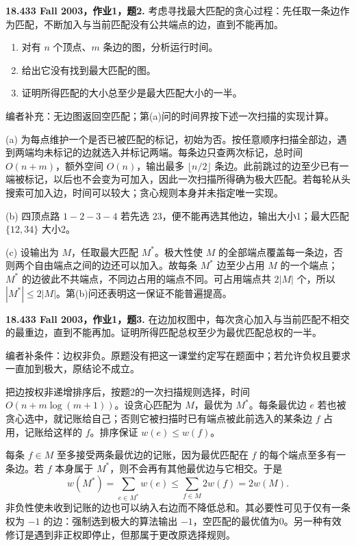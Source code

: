 \begin{exercise}\label{mit:18433-a1-q2}
\textbf{18.433 Fall 2003，作业1，题2.}
考虑寻找最大匹配的贪心过程：先任取一条边作为匹配，不断加入与当前匹配没有公共端点的边，直到不能再加。
\begin{enumerate}[label=(\alph*)]
\item 对有 $n$ 个顶点、$m$ 条边的图，分析运行时间。
\item 给出它没有找到最大匹配的图。
\item 证明所得匹配的大小总至少是最大匹配大小的一半。
\end{enumerate}
编者补充：无边图返回空匹配；第(a)问的时间界按下述一次扫描的实现计算。
\end{exercise}
\begin{solution}
(a) 为每点维护一个是否已被匹配的标记，初始为否。按任意顺序扫描全部边，遇到两端均未标记的边就选入并标记两端。每条边只查两次标记，总时间 $O(n+m)$，额外空间 $O(n)$，输出最多 $\lfloor n/2\rfloor$ 条边。此前跳过的边至少已有一端被标记，以后也不会变为可加入，因此一次扫描所得确为极大匹配。若每轮从头搜索可加入边，时间可以较大；贪心规则本身并未指定唯一实现。

(b) 四顶点路 $1-2-3-4$ 若先选 $23$，便不能再选其他边，输出大小1；最大匹配 $\{12,34\}$ 大小2。

(c) 设输出为 $M$，任取最大匹配 $M^*$。极大性使 $M$ 的全部端点覆盖每一条边，否则两个自由端点之间的边还可以加入。故每条 $M^*$ 边至少占用 $M$ 的一个端点；$M^*$ 的边彼此不共端点，不同边占用的端点不同。可占用端点共 $2|M|$ 个，所以 $|M^*|\le2|M|$。第(b)问还表明这一保证不能普遍提高。
\end{solution}

\begin{exercise}\label{mit:18433-a1-q3}
\textbf{18.433 Fall 2003，作业1，题3.}
在边加权图中，每次贪心加入与当前匹配不相交的最重边，直到不能再加。证明所得匹配总权至少为最优匹配总权的一半。

编者补条件：边权非负。原题没有把这一课堂约定写在题面中；若允许负权且要求一直加到极大，原结论不成立。
\end{exercise}
\begin{solution}
把边按权非递增排序后，按题2的一次扫描规则选择，时间 $O(n+m\log(m+1))$。设贪心匹配为 $M$，最优为 $M^*$。每条最优边 $e$ 若也被贪心选中，就记账给自己；否则它被扫描时已有端点被此前选入的某条边 $f$ 占用，记账给这样的 $f$。排序保证 $w(e)\le w(f)$。

每条 $f\in M$ 至多接受两条最优边的记账，因为最优匹配在 $f$ 的每个端点至多有一条边。若 $f$ 本身属于 $M^*$，则不会再有其他最优边与它相交。于是
\[
 w(M^*)=\sum_{e\in M^*}w(e)\le\sum_{f\in M}2w(f)=2w(M).
\]
非负性使未收到记账的边也可以纳入右边而不降低总和。其必要性可见于仅有一条权为 $-1$ 的边：强制选到极大的算法输出 $-1$，空匹配的最优值为0。另一种有效修订是遇到非正权即停止，但那属于更改原选择规则。
\end{solution}

